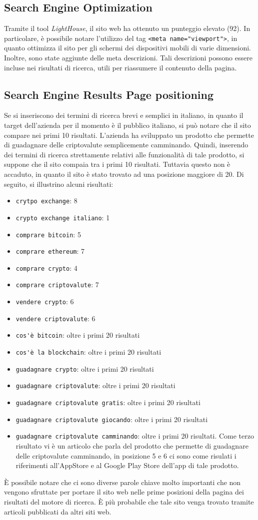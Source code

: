 \subsection{Search Engine Optimization}

Tramite il tool \textit{LightHouse}, il sito web ha ottenuto un punteggio 
elevato (92). In particolare, è possibile notare l'utilizzo del tag 
\verb|<meta name="viewport">|, in quanto ottimizza il sito per gli schermi 
dei dispositivi mobili di varie dimensioni. Inoltre, sono state aggiunte 
delle meta descrizioni. Tali descrizioni possono essere incluse nei 
risultati di ricerca, utili per riassumere il contenuto della pagina.

\subsection{Search Engine Results Page positioning}

Se si inseriscono dei termini di ricerca brevi e semplici in italiano, 
in quanto il target dell'azienda per il momento è il pubblico italiano, 
si può notare che il sito compare nei primi 10 risultati. L'azienda ha 
sviluppato un prodotto che permette di guadagnare delle criptovalute 
semplicemente camminando. Quindi, inserendo dei termini di ricerca 
strettamente relativi alle funzionalità di tale prodotto, si suppone che 
il sito compaia tra i primi 10 risultati. Tuttavia questo non è accaduto, 
in quanto il sito è stato trovato ad una posizione maggiore di 20. Di 
seguito, si illustrino alcuni risultati:
\begin{itemize}
  \item \verb|crytpo exchange|: 8
  \item \verb|crypto exchange italiano|: 1
  \item \verb|comprare bitcoin|: 5
  \item \verb|comprare ethereum|: 7
  \item \verb|comprare crypto|: 4
  \item \verb|comprare criptovalute|: 7
  \item \verb|vendere crypto|: 6
  \item \verb|vendere criptovalute|: 6
  \item \verb|cos'è bitcoin|: oltre i primi 20 risultati
  \item \verb|cos'è la blockchain|: oltre i primi 20 risultati
  \item \verb|guadagnare crypto|: oltre i primi 20 risultati
  \item \verb|guadagnare criptovalute|: oltre i primi 20 risultati
  \item \verb|guadagnare criptovalute gratis|: oltre i primi 20 risultati
  \item \verb|guadagnare criptovalute giocando|: oltre i primi 20 risultati
  \item \verb|guadagnare criptovalute camminando|: oltre i primi 20 
  risultati. Come terzo risultato vi è un articolo che parla del prodotto 
  che permette di guadagnare delle criptovalute camminando, in posizione  
  5 e 6 ci sono come risulati i riferimenti all'AppStore e al Google Play 
  Store dell'app di tale prodotto.
\end{itemize}

È possibile notare che ci sono diverse parole chiave molto importanti che 
non vengono sfruttate per portare il sito web nelle prime posizioni della 
pagina dei risultati del motore di ricerca. È più probabile che tale sito 
venga trovato tramite articoli pubblicati da altri siti web.